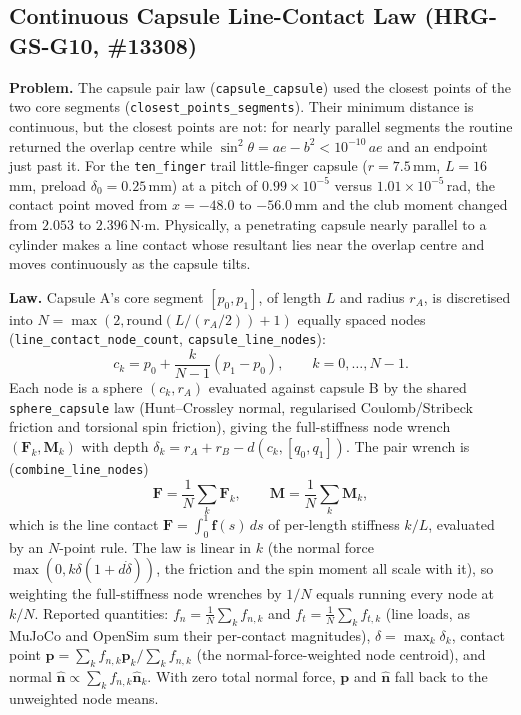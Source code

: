 \documentclass[11pt,a4paper]{article}
\begin{document}
\subsection{Continuous Capsule Line-Contact Law (HRG-GS-G10, \#13308)}
\label{sec:hrg-gs-line-contact}
\textbf{Problem.} The capsule pair law (\texttt{capsule\_capsule}) used the closest points of the two core segments
(\texttt{closest\_points\_segments}). Their minimum distance is continuous, but the closest points are not: for nearly
parallel segments the routine returned the overlap centre while $\sin^2\theta = a e - b^2 < 10^{-10}\,a e$ and an endpoint
just past it. For the \texttt{ten\_finger} trail little-finger capsule ($r = 7.5$\,mm, $L = 16$\,mm, preload
$\delta_0 = 0.25$\,mm) at a pitch of $0.99 \times 10^{-5}$ versus $1.01 \times 10^{-5}$\,rad, the contact point moved from
$x = -48.0$ to $-56.0$\,mm and the club moment changed from $2.053$ to $2.396$\,N$\cdot$m. Physically, a
penetrating capsule nearly parallel to a cylinder makes a line contact whose resultant lies near the overlap centre and
moves continuously as the capsule tilts.

\textbf{Law.} Capsule A's core segment $[p_0, p_1]$, of length $L$ and radius $r_A$, is discretised into
$N = \max(2, \mathrm{round}(L / (r_A/2)) + 1)$ equally spaced nodes (\texttt{line\_contact\_node\_count},
\texttt{capsule\_line\_nodes}):
\begin{equation}
c_k = p_0 + \frac{k}{N-1}(p_1 - p_0), \qquad k = 0, \dots, N-1.
\end{equation}
Each node is a sphere $(c_k, r_A)$ evaluated against capsule B by the shared \texttt{sphere\_capsule} law (Hunt--Crossley
normal, regularised Coulomb/Stribeck friction and torsional spin friction), giving the full-stiffness node wrench
$(\mathbf{F}_k, \mathbf{M}_k)$ with depth $\delta_k = r_A + r_B - d(c_k, [q_0, q_1])$. The pair wrench is
(\texttt{combine\_line\_nodes})
\begin{equation}
\mathbf{F} = \frac{1}{N}\sum_k \mathbf{F}_k, \qquad \mathbf{M} = \frac{1}{N}\sum_k \mathbf{M}_k,
\end{equation}
which is the line contact $\mathbf{F} = \int_0^1 \mathbf{f}(s)\,ds$ of per-length stiffness $k/L$, evaluated by an
$N$-point rule. The law is linear in $k$ (the normal force $\max(0, k\delta(1 + d\dot\delta))$, the friction and the spin
moment all scale with it), so weighting the full-stiffness node wrenches by $1/N$ equals running every node at $k/N$.
Reported quantities: $f_n = \tfrac1N\sum_k f_{n,k}$ and $f_t = \tfrac1N\sum_k f_{t,k}$ (line loads, as MuJoCo and
OpenSim sum their per-contact magnitudes), $\delta = \max_k \delta_k$, contact point
$\mathbf{p} = \sum_k f_{n,k}\mathbf{p}_k / \sum_k f_{n,k}$ (the normal-force-weighted node centroid), and normal
$\hat{\mathbf{n}} \propto \sum_k f_{n,k}\hat{\mathbf{n}}_k$. With zero total normal force, $\mathbf{p}$ and
$\hat{\mathbf{n}}$ fall back to the unweighted node means.
\end{document}
